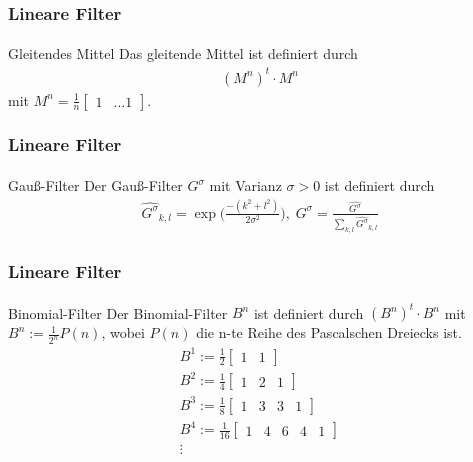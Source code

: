 \documentclass{beamer}
\begin{document}
\begin{frame}
    \frametitle{Lineare Filter}
\framesubtitle{}

\begin{block}{Gleitendes Mittel}
Das gleitende Mittel ist definiert durch 
\begin{align*}
(M^n)^t \cdot M^n 
\end{align*}
mit $M^n = \frac{1}{n}  \begin{bmatrix}  1 & \ldots 1\end{bmatrix}$.
\end{block}

 \end{frame}


\begin{frame}
    \frametitle{Lineare Filter}
\framesubtitle{}

\begin{block}{Gauß-Filter}
Der Gauß-Filter $G^\sigma$ mit Varianz $\sigma >0$ ist definiert durch  
\begin{align*}
\hat{G^\sigma}_{k,l} = \exp \biggl( \frac{-(k^2 + l^2)}{2 \sigma^2} \biggr), \; G^{\sigma} = \frac{\hat{G^\sigma}}{\sum_{k,l} \hat{G^\sigma}_{k,l}}
\end{align*}

\end{block}

 \end{frame}



\begin{frame}
    \frametitle{Lineare Filter}
\framesubtitle{}

\begin{block}{Binomial-Filter}
Der Binomial-Filter $B^n$ ist definiert durch $(B^n)^t \cdot B^n$ mit $B^n := \frac{1}{2^{n}} P(n)$, wobei $P(n)$ die n-te Reihe des Pascalschen Dreiecks ist. 
\begin{align*}
B^1 :=  \frac{1}{2} \begin{bmatrix}  1 & 1 \end{bmatrix} \\
B^2 :=  \frac{1}{4} \begin{bmatrix}  1 & 2 & 1\end{bmatrix} \\
B^3 :=  \frac{1}{8} \begin{bmatrix}  1 & 3 & 3 & 1\end{bmatrix} \\
B^4 :=  \frac{1}{16} \begin{bmatrix}  1 & 4 & 6 & 4 & 1\end{bmatrix} \\
\vdots
\end{align*}

\end{block}

 \end{frame}
\end{document}
